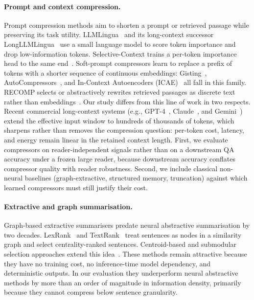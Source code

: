 \documentclass[11pt]{article}
\begin{document}
\paragraph{Prompt and context compression.}
Prompt compression methods aim to shorten a prompt or retrieved passage
while preserving its task utility.
LLMLingua~\citep{jiang2023llmlingua} and its long-context successor
LongLLMLingua~\citep{jiang2024longllmlingua} use a small language model to
score token importance and drop low-information tokens. Selective-Context
trains a per-token importance head to the same
end~\citep{li2023selective}. Soft-prompt compressors learn to replace a
prefix of tokens with a shorter sequence of continuous embeddings:
Gisting~\citep{mu2023gisting}, AutoCompressors~\citep{chevalier2023autocompressors},
and In-Context Autoencoders (ICAE)~\citep{ge2024icae} all fall in this
family. RECOMP selects or abstractively rewrites retrieved passages as
discrete text rather than embeddings~\citep{xu2024recomp}. Our study
differs from this line of work in two respects.
Recent commercial long-context systems (e.g.,
GPT-4~\citep{openai2023gpt4},
Claude~,
and Gemini~\citep{team2023gemini}) extend the effective input window
to hundreds of thousands of tokens, which sharpens rather than removes the
compression question: per-token cost, latency, and energy remain linear
in the retained context length. First, we evaluate
compressors on reader-independent signals rather than on a downstream
QA accuracy under a frozen large reader, because downstream accuracy
conflates compressor quality with reader robustness. Second, we include
classical non-neural baselines (graph-extractive, structured memory,
truncation) against which learned compressors must still justify their
cost.

\paragraph{Extractive and graph summarisation.}
Graph-based extractive summarisers predate neural abstractive
summarisation by two decades. LexRank~\citep{erkan2004lexrank} and
TextRank~\citep{mihalcea2004textrank} treat sentences as nodes in a
similarity graph and select centrality-ranked sentences.
Centroid-based and submodular selection approaches extend this
idea~\citep{radev2004centroid,lin2011class,salton1988term}. These methods remain
attractive because they have no training cost, no inference-time model
dependency, and deterministic outputs. In our evaluation they
underperform neural abstractive methods by more than an order of
magnitude in information density, primarily because they cannot
compress below sentence granularity.
\end{document}
